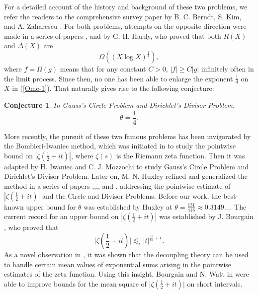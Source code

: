 \documentclass[11pt]{amsart}
\numberwithin{equation}{section}
\newtheorem{conjecture}[theorem]{Conjecture}
\theoremstyle{definition}
\theoremstyle{proposition}
\begin{document}
For a detailed account of the history and background of these two problems, we refer the readers to the comprehensive survey paper by B. C. Berndt, S. Kim, and A. Zaharescu \cite{Bruce}.  For both problems, attempts on the opposite direction
were made in a series of papers \cite{Hardy1},\cite{Hardy2} and \cite{Hardy3} by G. H. Hardy, who proved that both $R(X)$ and $\Delta(X)$ are 
\begin{equation}\label{Ome-1}
\Omega ((X\log X)^{\frac{1}{4}}),
\end{equation}
where $f=\Omega(g)$ means that for any constant $C>0$, $|f|\ge C |g|$ infinitely often in the limit process. Since then, no one has been able to enlarge the exponent $\frac{1}{4}$ on $X$ in  (\ref{Ome-1}).  That naturally gives rise to the following conjecture:
\begin{conjecture}   \label{conj-1}
In Gauss's Circle Problem and Dirichlet's Divisor Problem, 
\[
\theta=\frac{1}{4}. 
\]
\end{conjecture}
More recently, the pursuit of these two famous problems has been invigorated by the Bombieri-Iwaniec method, which was initiated in \cite{BombieriIwaniec} to study the pointwise bound on $|\zeta(\frac{1}{2}+it)|$, where $\zeta(s)$ is the Riemann zeta function. Then it was adapted by H. Iwaniec and C. J. Mozzochi \cite{IwaniecMozzochi} to study Gauss's Circle Problem and Dirichlet's Divisor Problem. 
Later on, M. N. Huxley refined and generalized the method in a series of papers \cite{HuxleyZeta1},\cite{HuxleyZeta4},\cite{HuxleyZeta5},\cite{HuxleyCircle1},\cite{Huxley03} and \cite{HuxleyRC}, addressing the pointwise estimate of $|\zeta(\frac{1}{2}+it)|$ and the Circle and Divisor Problems. Before our work, the best-known upper bound for $\theta$ was established by Huxley \cite{Huxley03} at $\theta=\frac{131}{416}\approx 0.3149\dots$. 
The current record for an upper bound on $|\zeta(\frac{1}{2}+it)|$ was established by J. Bourgain \cite{BourgainZeta}, who proved that 
\[
\Big|\zeta(\frac{1}{2}+it)\Big|\lesssim_\epsilon |t|^{\frac{13}{84}+\epsilon}.
\]
As a novel observation in \cite{BourgainZeta}, it was shown that the decoupling theory can be used to handle certain mean values of
exponential sums arising in the pointwise estimates of the zeta function. 
Using this insight, Bourgain and N. Watt in \cite{BourgainWatt1st} were able to improve bounds for the mean square of $\big|\zeta(\frac{1}{2}+it)\big|$ on short intervals. \\
\end{document}
